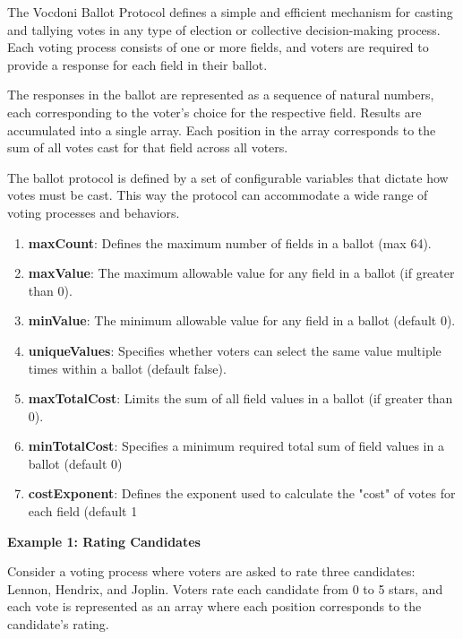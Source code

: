
The Vocdoni Ballot Protocol defines a simple and efficient mechanism for casting and tallying votes in any type of election or collective decision-making process. Each voting process consists of one or more fields, and voters are required to provide a response for each field in their ballot.

The responses in the ballot are represented as a sequence of natural numbers, each corresponding to the voter’s choice for the respective field. Results are accumulated into a single array. Each position in the array corresponds to the sum of all votes cast for that field across all voters.

The ballot protocol is defined by a set of configurable variables that dictate how votes must be cast. This way the protocol can accommodate a wide range of voting processes and behaviors.

\begin{enumerate}
	\item \textbf{maxCount}: Defines the maximum number of fields in a ballot (max 64).
	\item \textbf{maxValue}: The maximum allowable value for any field in a ballot (if greater than 0).
	\item \textbf{minValue}: The minimum allowable value for any field in a ballot (default 0).
	\item \textbf{uniqueValues}: Specifies whether voters can select the same value multiple times within a ballot (default false).
	\item \textbf{maxTotalCost}: Limits the sum of all field values in a ballot (if greater than 0).
	\item \textbf{minTotalCost}: Specifies a minimum required total sum of field values in a ballot (default 0)
	\item \textbf{costExponent}: Defines the exponent used to calculate the "cost" of votes for each field (default 1
\end{enumerate}

\begin{figure}[H]
	\centering
\end{figure}

\textbf{Example 1: Rating Candidates}

Consider a voting process where voters are asked to rate three candidates: Lennon, Hendrix, and Joplin. Voters rate each candidate from 0 to 5 stars, and each vote is represented as an array where each position corresponds to the candidate’s rating.

